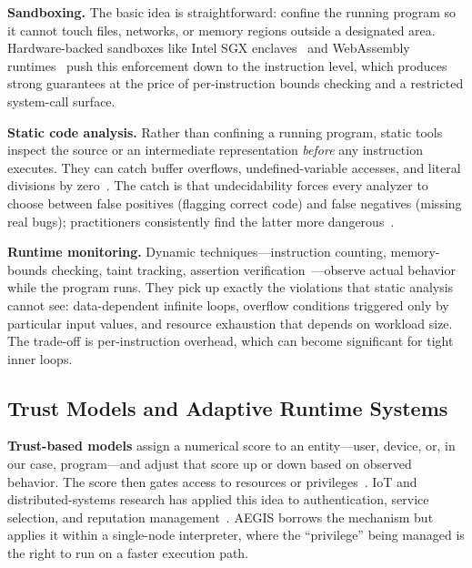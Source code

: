 \documentclass[conference]{IEEEtran}
\begin{document}
\textbf{Sandboxing.}  The basic idea is straightforward: confine
the running program so it cannot touch files, networks, or memory
regions outside a designated area.  Hardware-backed sandboxes
like Intel SGX enclaves~\cite{menetrey2024sgx} and WebAssembly
runtimes~\cite{johnson2023wave,lehmann2020wasm,wasm_survey2024,tang2023wasm_runtimes}
push this enforcement down to the instruction level, which
produces strong guarantees at the price of per-instruction
bounds checking and a restricted system-call surface.

\textbf{Static code analysis.}  Rather than confining a
running program, static tools inspect the source or an
intermediate representation \emph{before} any instruction
executes.  They can catch buffer overflows, undefined-variable
accesses, and literal divisions by
zero~\cite{jiang2020elaid,khoury2022buffer}.  The catch is
that undecidability forces every analyzer to choose between
false positives (flagging correct code) and false negatives
(missing real bugs); practitioners consistently find the
latter more
dangerous~\cite{ami2024false_neg,huang2024static}.

\textbf{Runtime monitoring.}  Dynamic techniques---instruction
counting, memory-bounds checking, taint tracking, assertion
verification~\cite{wang2022vulnets}---observe actual behavior
while the program runs.  They pick up exactly the violations
that static analysis cannot see: data-dependent infinite loops,
overflow conditions triggered only by particular input values,
and resource exhaustion that depends on workload size.  The
trade-off is per-instruction overhead, which can become
significant for tight inner loops.

\subsection{Trust Models and Adaptive Runtime Systems}

\textbf{Trust-based models} assign a numerical score to an
entity---user, device, or, in our case, program---and adjust
that score up or down based on observed behavior.  The score
then gates access to resources or
privileges~\cite{wang2022trust,li2022iot_trust,fernandez2024sla}.
IoT and distributed-systems research has applied this idea to
authentication, service selection, and reputation
management~\cite{ullah2024deeptrust}.  AEGIS borrows the
mechanism but applies it within a single-node interpreter,
where the ``privilege'' being managed is the right to run on
a faster execution path.
\end{document}

